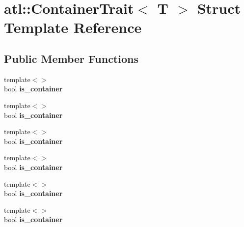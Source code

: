 \hypertarget{structatl_1_1_container_trait}{\section{atl\+:\+:Container\+Trait$<$ T $>$ Struct Template Reference}
\label{structatl_1_1_container_trait}
}
\subsection*{Public Member Functions}
\begin{DoxyCompactItemize}
\item 
\hypertarget{structatl_1_1_container_trait_ad88fff76b558b59ec893779fa940e58b}{{\footnotesize template$<$$>$ }\\bool {\bfseries is\+\_\+container}}\label{structatl_1_1_container_trait_ad88fff76b558b59ec893779fa940e58b}

\item 
\hypertarget{structatl_1_1_container_trait_a5b14e7dd1c0651ce1ea1ca8ec91591e9}{{\footnotesize template$<$$>$ }\\bool {\bfseries is\+\_\+container}}\label{structatl_1_1_container_trait_a5b14e7dd1c0651ce1ea1ca8ec91591e9}

\item 
\hypertarget{structatl_1_1_container_trait_a82a1bbd27ff858e8e94dc4ef6339bf57}{{\footnotesize template$<$$>$ }\\bool {\bfseries is\+\_\+container}}\label{structatl_1_1_container_trait_a82a1bbd27ff858e8e94dc4ef6339bf57}

\item 
\hypertarget{structatl_1_1_container_trait_ad88fff76b558b59ec893779fa940e58b}{{\footnotesize template$<$$>$ }\\bool {\bfseries is\+\_\+container}}\label{structatl_1_1_container_trait_ad88fff76b558b59ec893779fa940e58b}

\item 
\hypertarget{structatl_1_1_container_trait_a5b14e7dd1c0651ce1ea1ca8ec91591e9}{{\footnotesize template$<$$>$ }\\bool {\bfseries is\+\_\+container}}\label{structatl_1_1_container_trait_a5b14e7dd1c0651ce1ea1ca8ec91591e9}

\item 
\hypertarget{structatl_1_1_container_trait_a82a1bbd27ff858e8e94dc4ef6339bf57}{{\footnotesize template$<$$>$ }\\bool {\bfseries is\+\_\+container}}\label{structatl_1_1_container_trait_a82a1bbd27ff858e8e94dc4ef6339bf57}

\end{DoxyCompactItemize}
